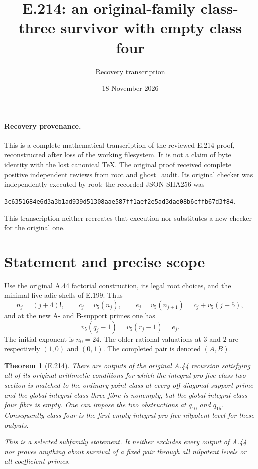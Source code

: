 \documentclass[11pt]{article}
\title{E.214: an original-family class-three survivor with empty class four}
\author{Recovery transcription}\date{18 November 2026}
\newtheorem{theorem}{Theorem}
\begin{document}
\maketitle
\paragraph{Recovery provenance.}
This is a complete mathematical transcription of the reviewed E.214 proof, reconstructed after loss of the working filesystem. It is not a claim of byte identity with the lost canonical TeX. The original proof received complete positive independent reviews from root and ghost\_audit. Its original checker was independently executed by root; the recorded JSON SHA256 was
\begin{center}\texttt{3c6351684e6d3a3b1ad939d51308aae587ff1aef2e5ad3dae08b6cffb67d3f84}.\end{center}
This transcription neither recreates that execution nor substitutes a new checker for the original one.

\section*{Statement and precise scope}
Use the original A.44 factorial construction, its legal root choices, and the minimal five-adic shells of E.199. Thus
\[
 n_j=(j+4)!,\qquad c_j=v_5(n_j),\qquad
 e_j=v_5(n_{j+1})=c_j+v_5(j+5),
\]
and at the new A- and B-support primes one has
\[
 v_5(q_j-1)=v_5(r_j-1)=e_j.
\]
The initial exponent is $n_0=24$. The older rational valuations at $3$ and $2$ are respectively $(1,0)$ and $(0,1)$. The completed pair is denoted $(A,B)$.

\begin{theorem}[E.214]
There are outputs of the original A.44 recursion satisfying all of its original arithmetic conditions for which the integral pro-five class-two section is matched to the ordinary point class at every off-diagonal support prime and the global integral class-three fibre is nonempty, but the global integral class-four fibre is empty. One can impose the two obstructions at $q_{10}$ and $q_{15}$. Consequently class four is the first empty integral pro-five nilpotent level for these outputs.

This is a selected subfamily statement. It neither excludes every output of A.44 nor proves anything about survival of a fixed pair through all nilpotent levels or all coefficient primes.
\end{theorem}
\end{document}
